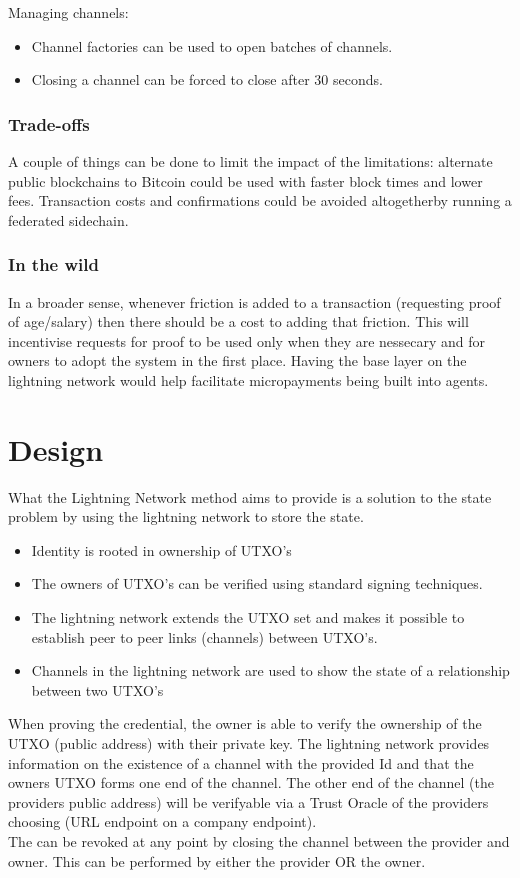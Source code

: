 \documentclass[10pt,a4paper]{runcrypto}
\begin{document}
Managing channels:
\begin{itemize}
	\item Channel factories can be used to open batches of channels.
	\item Closing a channel can be forced to close after 30 seconds.
\end{itemize}

\subsubsection{Trade-offs}

A couple of things can be done to limit the impact of the limitations: alternate public blockchains to Bitcoin could be used with faster block times and lower fees. Transaction costs and confirmations could be avoided altogetherby running a federated sidechain.

\subsubsection{In the wild}
In a broader sense, whenever friction is added to a transaction (requesting proof of age/salary) then there should be a cost to adding that friction. This will incentivise requests for proof to be used only when they are nessecary and for owners to adopt the system in the first place. Having the base layer on the lightning network would help facilitate micropayments being built into agents.

\section{Design}
What the Lightning Network method aims to provide is a solution to the state problem by using the lightning network to store the \diddoc state.
\begin{itemize}
	\item Identity is rooted in ownership of UTXO's
    \item The owners of UTXO's can be verified using standard signing techniques.
    \item The lightning network extends the UTXO set and makes it possible to establish peer to peer links (channels) between UTXO's.
    \item Channels in the lightning network are used to show the state of a relationship between two UTXO's
\end{itemize}

When proving the credential, the owner is able to verify the ownership of the UTXO (public address) with their private key. The lightning network provides information on the existence of a channel with the provided Id and that the owners UTXO forms one end of the channel. The other end of the channel (the providers public address) will be verifyable via a Trust Oracle of the providers choosing (URL endpoint on a company endpoint).
\\
The \diddoc can be revoked at any point by closing the channel between the provider and owner. This can be performed by either the provider OR the owner.
\end{document}
